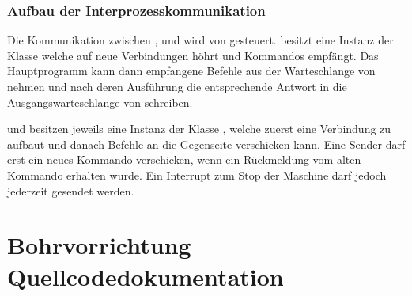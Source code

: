 \documentclass[letterpaper,10pt,english]{sphinxmanual}
\begin{document}
\subsection{Aufbau der Interprozesskommunikation}
\label{_xfcberblick:aufbau-der-interprozesskommunikation}
Die Kommunikation zwischen {\hyperref[gui:module\string-gui]{}}, {\hyperref[button:module\string-button]{}} und {\hyperref[bohrvorrichtung:module\string-bohrvorrichtung]{}} wird von
{\hyperref[communicationUtilities:module\string-communicationUtilities]{}} gesteuert. {\hyperref[bohrvorrichtung:module\string-bohrvorrichtung]{}} besitzt eine Instanz der Klasse
{\hyperref[communicationUtilities:communicationUtilities.CommandReceiver]{}} welche auf neue Verbindungen höhrt und Kommandos
empfängt. Das Hauptprogramm kann dann empfangene Befehle aus der Warteschlange von
{\hyperref[communicationUtilities:communicationUtilities.CommandReceiver]{}} nehmen und nach deren Ausführung die entsprechende
Antwort in die Ausgangswarteschlange von {\hyperref[communicationUtilities:communicationUtilities.CommandReceiver]{}} schreiben.

{\hyperref[gui:module\string-gui]{}} und {\hyperref[button:module\string-button]{}} besitzen jeweils eine Instanz der Klasse
{\hyperref[communicationUtilities:communicationUtilities.CommandSender]{}},
welche zuerst eine Verbindung zu {\hyperref[communicationUtilities:communicationUtilities.CommandReceiver]{}}
aufbaut und danach Befehle an die Gegenseite verschicken kann. Eine Sender darf erst ein neues
Kommando verschicken, wenn ein Rückmeldung vom alten Kommando erhalten wurde. Ein Interrupt zum
Stop der Maschine darf jedoch jederzeit gesendet werden.


\chapter{Bohrvorrichtung Quellcodedokumentation}
\label{modules::doc}\label{modules:bohrvorrichtung-quellcodedokumentation}
\end{document}
